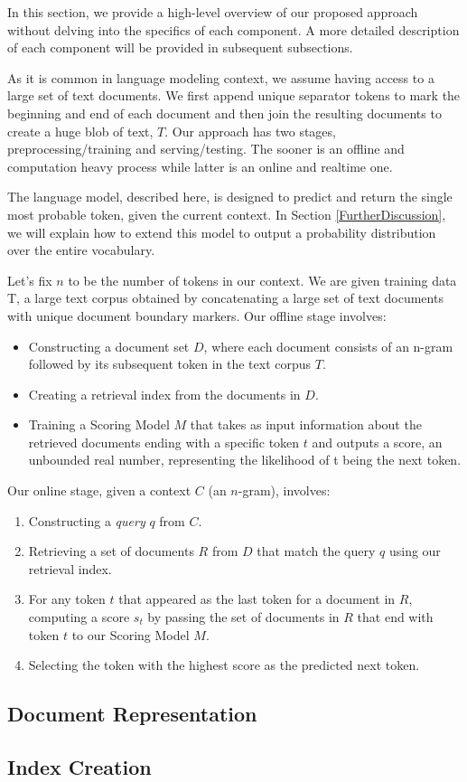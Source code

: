    In this section, we provide a high-level overview of our proposed approach without delving into the specifics of each component. A more detailed description of each component will be provided in subsequent subsections.

  As it is common in language modeling context, we assume having access to a  large set of text documents. We first append unique separator tokens to mark the beginning and end of each document and then join the resulting documents to create a huge blob of text, $T$. Our approach has two stages, preprocessing/training and serving/testing. The sooner is an offline and computation heavy process while latter is an online and realtime one.
 
    The language model, described here, is designed to predict and return the single most probable token, given the current context. In Section \ref{FurtherDiscussion}, we will explain how to extend this model to output a probability distribution over the entire vocabulary.

  Let's fix $n$ to be the number of tokens in our context. We are given training data T, a large text corpus obtained by concatenating a large set of text documents with unique document boundary markers.
  Our offline stage involves:
\begin{itemize}
\item Constructing a document set $D$, where each document consists of an n-gram followed by its subsequent token in the text corpus $T$.
\item Creating a retrieval index from the documents in $D$.
\item Training a Scoring Model $M$ that takes as input information about the retrieved documents ending with a specific token $t$ and outputs a score, an unbounded real number, representing the likelihood of t being the next token.
\end{itemize}

\noindent Our online stage, given a context $C$ (an $n$-gram), involves:
\begin{enumerate}
\item Constructing a \textit{query} $q$ from $C$.
\item Retrieving a set of documents $R$ from $D$ that match the query $q$ using our retrieval index.
\item For any token $t$ that appeared as the last token for a document in $R$, computing a score $s_t$ by passing the set of documents in $R$ that end with token $t$ to our Scoring Model $M$.
\item Selecting the token with the highest score as the predicted next token.
\end{enumerate}

\subsection{Document Representation}


\subsection{Index Creation}
  
  

